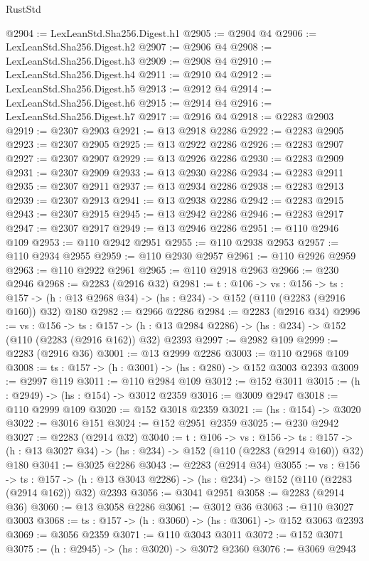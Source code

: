\begin{lexlean}{RustStd}
\begin{coremodule}
@2904 := LexLeanStd.Sha256.Digest.h1
@2905 := @2904 @4
@2906 := LexLeanStd.Sha256.Digest.h2
@2907 := @2906 @4
@2908 := LexLeanStd.Sha256.Digest.h3
@2909 := @2908 @4
@2910 := LexLeanStd.Sha256.Digest.h4
@2911 := @2910 @4
@2912 := LexLeanStd.Sha256.Digest.h5
@2913 := @2912 @4
@2914 := LexLeanStd.Sha256.Digest.h6
@2915 := @2914 @4
@2916 := LexLeanStd.Sha256.Digest.h7
@2917 := @2916 @4
@2918 := @2283 @2903
@2919 := @2307 @2903
@2921 := @13 @2918 @2286
@2922 := @2283 @2905
@2923 := @2307 @2905
@2925 := @13 @2922 @2286
@2926 := @2283 @2907
@2927 := @2307 @2907
@2929 := @13 @2926 @2286
@2930 := @2283 @2909
@2931 := @2307 @2909
@2933 := @13 @2930 @2286
@2934 := @2283 @2911
@2935 := @2307 @2911
@2937 := @13 @2934 @2286
@2938 := @2283 @2913
@2939 := @2307 @2913
@2941 := @13 @2938 @2286
@2942 := @2283 @2915
@2943 := @2307 @2915
@2945 := @13 @2942 @2286
@2946 := @2283 @2917
@2947 := @2307 @2917
@2949 := @13 @2946 @2286
@2951 := @110 @2946 @109
@2953 := @110 @2942 @2951
@2955 := @110 @2938 @2953
@2957 := @110 @2934 @2955
@2959 := @110 @2930 @2957
@2961 := @110 @2926 @2959
@2963 := @110 @2922 @2961
@2965 := @110 @2918 @2963
@2966 := @230 @2946
@2968 := @2283 (@2916 @32)
@2981 := {t : @106} ->
  {vs : @156} ->
  {ts : @157} -> (h : @13 @2968 @34) -> (hs : @234) -> @152 (@110 (@2283 (@2916 @160)) @32) @180
@2982 := @2966 @2286
@2984 := @2283 (@2916 @34)
@2996 := {vs : @156} ->
  {ts : @157} -> (h : @13 @2984 @2286) -> (hs : @234) -> @152 (@110 (@2283 (@2916 @162)) @32) @2393
@2997 := @2982 @109
@2999 := @2283 (@2916 @36)
@3001 := @13 @2999 @2286
@3003 := @110 @2968 @109
@3008 := {ts : @157} -> (h : @3001) -> (hs : @280) -> @152 @3003 @2393
@3009 := @2997 @119
@3011 := @110 @2984 @109
@3012 := @152 @3011
@3015 := (h : @2949) -> (hs : @154) -> @3012 @2359
@3016 := @3009 @2947
@3018 := @110 @2999 @109
@3020 := @152 @3018 @2359
@3021 := (hs : @154) -> @3020
@3022 := @3016 @151
@3024 := @152 @2951 @2359
@3025 := @230 @2942
@3027 := @2283 (@2914 @32)
@3040 := {t : @106} ->
  {vs : @156} ->
  {ts : @157} -> (h : @13 @3027 @34) -> (hs : @234) -> @152 (@110 (@2283 (@2914 @160)) @32) @180
@3041 := @3025 @2286
@3043 := @2283 (@2914 @34)
@3055 := {vs : @156} ->
  {ts : @157} -> (h : @13 @3043 @2286) -> (hs : @234) -> @152 (@110 (@2283 (@2914 @162)) @32) @2393
@3056 := @3041 @2951
@3058 := @2283 (@2914 @36)
@3060 := @13 @3058 @2286
@3061 := @3012 @36
@3063 := @110 @3027 @3003
@3068 := {ts : @157} -> (h : @3060) -> (hs : @3061) -> @152 @3063 @2393
@3069 := @3056 @2359
@3071 := @110 @3043 @3011
@3072 := @152 @3071
@3075 := (h : @2945) -> (hs : @3020) -> @3072 @2360
@3076 := @3069 @2943

\end{coremodule}
\end{lexlean}

